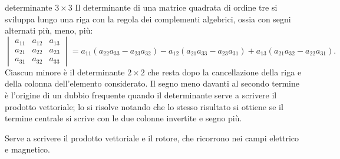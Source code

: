 \documentclass[main.tex]{subfiles}
\begin{document}
\renewcommand{\richiamoprefix}{Richiamo di Matematica --- }
\begin{riquadro}{determinante $3\times3$}
Il determinante di una matrice quadrata di ordine tre si sviluppa lungo una riga con la regola dei complementi algebrici, ossia con segni alternati più, meno, più:
\[
\begin{vmatrix} a_{11}&a_{12}&a_{13}\\ a_{21}&a_{22}&a_{23}\\ a_{31}&a_{32}&a_{33}\end{vmatrix}
=a_{11}(a_{22}a_{33}-a_{23}a_{32})-a_{12}(a_{21}a_{33}-a_{23}a_{31})+a_{13}(a_{21}a_{32}-a_{22}a_{31}).
\]
Ciascun minore è il determinante $2\times2$ che resta dopo la cancellazione della riga e della colonna dell'elemento considerato. Il segno meno davanti al secondo termine è l'origine di un dubbio frequente quando il determinante serve a scrivere il prodotto vettoriale; lo si risolve notando che lo stesso risultato si ottiene se il termine centrale si scrive con le due colonne invertite e segno più.

Serve a scrivere il prodotto vettoriale e il rotore, che ricorrono nei campi elettrico e magnetico.
\end{riquadro}
\end{document}
